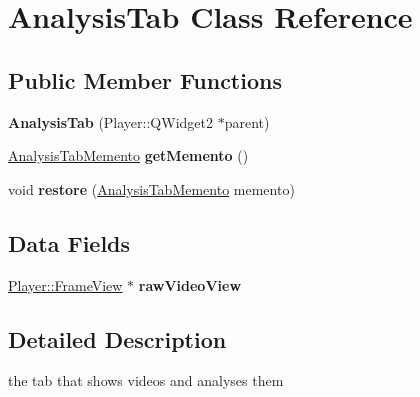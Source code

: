 \hypertarget{classAnalysisTab}{}\section{Analysis\+Tab Class Reference}
\label{classAnalysisTab}
\subsection*{Public Member Functions}
\begin{DoxyCompactItemize}
\item 
\hypertarget{classAnalysisTab_aad3a44604debfaf83ea7e5ae9b6bf48f}{}{\bfseries Analysis\+Tab} (Player\+::\+Q\+Widget2 $\ast$parent)\label{classAnalysisTab_aad3a44604debfaf83ea7e5ae9b6bf48f}

\item 
\hypertarget{classAnalysisTab_a8a921c6e5f7eab6aec79c034dd6c24b6}{}\hyperlink{classAnalysisTabMemento}{Analysis\+Tab\+Memento} {\bfseries get\+Memento} ()\label{classAnalysisTab_a8a921c6e5f7eab6aec79c034dd6c24b6}

\item 
\hypertarget{classAnalysisTab_a9684eab8e130b895aeb683f808eb86d1}{}void {\bfseries restore} (\hyperlink{classAnalysisTabMemento}{Analysis\+Tab\+Memento} memento)\label{classAnalysisTab_a9684eab8e130b895aeb683f808eb86d1}

\end{DoxyCompactItemize}
\subsection*{Data Fields}
\begin{DoxyCompactItemize}
\item 
\hypertarget{classAnalysisTab_a48a3e0b4ece500a95cfdce5a709133d1}{}\hyperlink{classPlayer_1_1FrameView}{Player\+::\+Frame\+View} $\ast$ {\bfseries raw\+Video\+View}\label{classAnalysisTab_a48a3e0b4ece500a95cfdce5a709133d1}

\end{DoxyCompactItemize}


\subsection{Detailed Description}
the tab that shows videos and analyses them 
